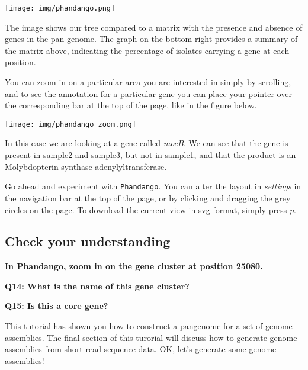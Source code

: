 \documentclass[11pt]{article}
\begin{document}
\begin{center}
\texttt{[image: img/phandango.png]}
\end{center}


    The image shows our tree compared to a matrix with the presence and
absence of genes in the pan genome. The graph on the bottom right
provides a summary of the matrix above, indicating the percentage of
isolates carrying a gene at each position.

You can zoom in on a particular area you are interested in simply by
scrolling, and to see the annotation for a particular gene you can place
your pointer over the corresponding bar at the top of the page, like in
the figure below.


\begin{center}
\texttt{[image: img/phandango\_zoom.png]}
\end{center}


In this case we are looking at a gene called \textit{moeB}. We can see
that the gene is present in sample2 and sample3, but not in sample1, and
that the product is an Molybdopterin-synthase adenylyltransferase.

Go ahead and experiment with \texttt{Phandango}. You can alter the
layout in \textit{settings} in the navigation bar at the top of the page,
or by clicking and dragging the grey circles on the page. To download
the current view in svg format, simply press \textit{p}.

\hypertarget{check-your-understanding}{%
\subsection{Check your understanding}\label{check-your-understanding}}

\textbf{In Phandango, zoom in on the gene cluster at position 25080.}

\textbf{Q14: What is the name of this gene cluster?}

\textbf{Q15: Is this a core gene?}

This tutorial has shown you how to construct a pangenome for a set of
genome assemblies. The final section of this turorial will discuss how
to generate genome assemblies from short read sequence data. OK, let's
\href{assembly.ipynb}{generate some genome assemblies}!





\newpage
\end{document}
